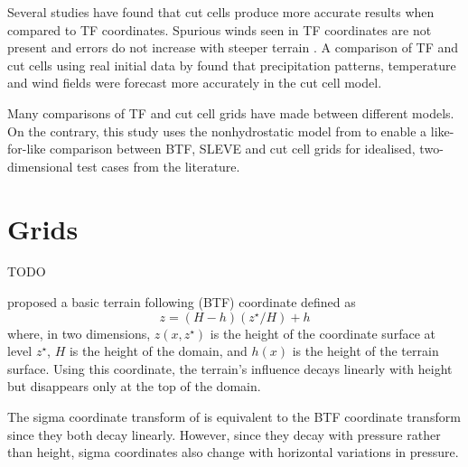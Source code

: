 \documentclass[twocol]{ametsoc}
\begin{document}
Several studies have found that cut cells produce more accurate results when compared to TF coordinates.  Spurious winds seen in TF coordinates are not present and errors do not increase with steeper terrain \citep{good2014}.  A comparison of TF and cut cells using real initial data by \citet{steppeler2006} found that precipitation patterns, temperature and wind fields were forecast more accurately in the cut cell model.  

Many comparisons of TF and cut cell grids have made between different models.  On the contrary, this study uses the nonhydrostatic model from \citet{weller-shahrokhi2014} to enable a like-for-like comparison between BTF, SLEVE and cut cell grids for idealised, two-dimensional test cases from the literature.  


\section{Grids}
\label{sec:grid}

\begin{figure*}
	\centering
	TODO
	\caption{Examples of (a) BTF, (b) SLEVE, and (c) a cut cell grid, all constructed with OpenFOAM.  The two dimensional grids are \SI{20}{\kilo\meter} wide and \SI{2}{\kilo\meter} high.  The cut cell grid was created by intersecting the terrain surface with a regular grid as described in section~\ref{sec:grid}.}
	\label{fig:grid}
\end{figure*}

\citet{galchen-somerville1975} proposed a basic terrain following (BTF) coordinate defined as 
\begin{equation}
	z = \left( H - h \right) \left( z^\star / H \right) + h
\end{equation}
where, in two dimensions, \(z(x, z^\star)\) is the height of the coordinate surface at level \(z^\star\), \(H\) is the height of the domain, and \(h(x)\) is the height of the terrain surface.  Using this coordinate, the terrain's influence decays linearly with height but disappears only at the top of the domain.

The sigma coordinate transform of \citet{phillips1957} is equivalent to the BTF coordinate transform since they both decay linearly.  However, since they decay with pressure rather than height, sigma coordinates also change with horizontal variations in pressure.
\end{document}
